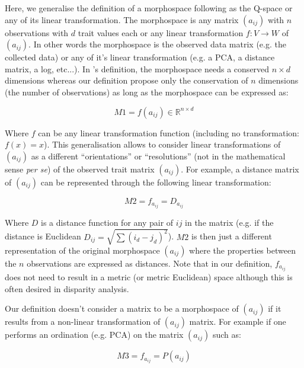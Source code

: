 \documentclass[12pt,letterpaper]{article}
\begin{document}
\setlength{\leftskip}{0pt}
\setlength{\rightskip}{0pt}

\noindent Here, we generalise the definition of a morphospace following \cite{mitteroecker2009concept} as the Q-space or any of its linear transformation.
The morphospace is any matrix $(a_{ij})$ with $n$ observations with $d$ trait values each or any linear transformation $f: V \to W$ of $(a_{ij})$.
In other words the morphospace is the observed data matrix (e.g. the collected data) or any of it's linear transformation (e.g. a PCA, a distance matrix, a log, etc...).
In \cite{mitteroecker2009concept}'s definition, the morphospace needs a conserved $n \times d$ dimensions whereas our definition propose only the conservation of $n$ dimensions (the number of observations) as long as the morphospace can be expressed as:

\begin{equation}
    M1 = f(a_{ij})\in \mathbb{R}^{{n}\times{d}}
\end{equation}

\noindent Where $f$ can be any linear transformation function (including no transformation: $f(x) = x$).
This generalisation allows to consider linear transformations of $(a_{ij})$ as a different ``orientations'' or ``resolutions'' (not in the mathematical sense \textit{per se}) of the observed trait matrix $(a_{ij})$. For example, a distance matrix of $(a_{ij})$ can be represented through the following linear transformation:

\begin{equation}
    M2 = f_{a_{ij}} = D_{a_{ij}}
\end{equation}

\noindent Where $D$ is a distance function for any pair of $ij$ in the matrix (e.g. if the distance is Euclidean $D_{ij} = \sqrt{\sum(i_{d}-j_{d})^2}$).
$M2$ is then just a different representation of the original morphospace $(a_{ij})$ where the properties between the $n$ observations are expressed as distances.
Note that in our definition, $f_{a_{ij}}$ does not need to result in a metric (or metric Euclidean) space although this is often desired in disparity analysis.

Our definition doesn't consider a matrix to be a morphospace of $(a_{ij})$ if it results from a non-linear transformation of $(a_{ij})$ matrix.
For example if one performs an ordination (e.g. PCA) on the matrix $(a_{ij})$ such as:

\begin{equation}
    M3 = f_{a_{ij}} = P(a_{ij})
\end{equation}
\end{document}
